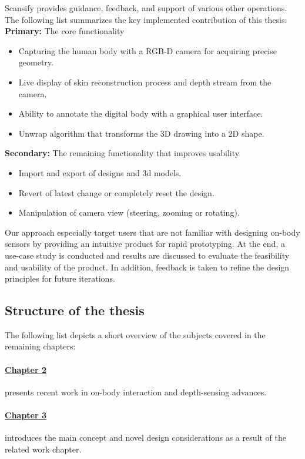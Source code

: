 Scansify provides guidance, feedback, and support of various other operations. The following list summarizes the key implemented contribution of this thesis:\newpara
\label{item:functionality}
\textbf{Primary:} The core functionality
\begin{itemize} 
\item[\textbf{a)}] Capturing the human body with a RGB-D camera for acquiring precise geometry.
\item[\textbf{b)}] Live display of skin reconstruction process and depth stream from the camera.
\item[\textbf{c)}] Ability to annotate the digital body with a graphical user interface.
\item[\textbf{d)}] Unwrap algorithm that transforms the 3D drawing into a 2D shape.\\
\end{itemize}
\textbf{Secondary:} The remaining functionality that improves usability
\begin{itemize} 
\item[\textbf{e)}] Import and export of designs and 3d models.
\item[\textbf{f)}] Revert of latest change or completely reset the design.
\item[\textbf{g)}] Manipulation of camera view (steering, zooming or rotating).\newpara\\
\end{itemize}
Our approach especially target users that are not familiar with designing on-body sensors by providing an intuitive product for rapid prototyping. At the end, a use-case study is conducted and results are discussed to evaluate the feasibility and usability of the product. In addition, feedback is taken to refine the design principles for future iterations.
\subsection{Structure of the thesis}
The following list depicts a short overview of the subjects covered in the remaining chapters:
\paragraph*{\hyperref[sec:relatedwork]{Chapter 2}} presents recent work in on-body interaction and depth-sensing advances.
\paragraph*{\hyperref[sec:goals]{Chapter 3}} introduces the main concept and novel design considerations as a result of the related work chapter.
